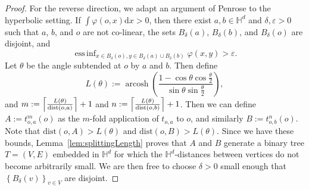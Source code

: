 \documentclass[10pt,a4paper,dvipsnames]{article}
\theoremstyle{definition}
\theoremstyle{remark}
\newcommand{\HypDim}{{\mathbb{H}^d}}
\newcommand{\dd}{\mathrm{d}} %
\DeclareMathOperator*{\essinf}{ess\,inf}
\DeclareMathOperator{\arcosh}{arcosh}
\DeclarePairedDelimiter\ceil{\lceil}{\rceil}
\newcommand{\dist}[1]{\mathrm{dist}\left(#1\right)}
\newcommand{\orig}{o}
\newcommand{\connf}{\varphi}
\numberwithin{equation}{section}
\begin{document}
\begin{proof}
    For the reverse direction, we adapt an argument of Penrose \cite{Pen91} to the hyperbolic setting. 
    If $\int\connf(\orig,x)\dd x>0$, then there exist $a,b\in\HypDim$ and $\delta,\varepsilon>0$ such that $a$, $b$, and $\orig$ are not co-linear, the sets $B_\delta(a)$, $B_\delta(b)$, and $B_\delta(\orig)$ are disjoint, and 
    \begin{equation}
        \essinf_{x\in B_\delta(\orig),y\in B_\delta(a)\cup B_\delta(b)}\connf(x,y)>\varepsilon.
    \end{equation}
    Let $\theta$ be the angle subtended at $\orig$ by $a$ and $b$. Then define
    \begin{equation}
        L\left(\theta\right) := \arcosh\left(\frac{1-\cos\theta\cos\frac{\theta}{2}}{\sin\theta\sin\frac{\theta}{2}}\right),
    \end{equation}
    and $m:=\ceil*{\frac{L(\theta)}{\dist{\orig,a}}}+1$ and $n:=\ceil*{\frac{L(\theta)}{\dist{\orig,b}}}+1$. Then we can define $A:= t_{\orig,a}^m(\orig)$ as the $m$-fold application of $t_{\orig,a}$ to $\orig$, and similarly $B:= t_{\orig,b}^n(\orig)$. Note that $\dist{\orig,A}>L(\theta)$ and $\dist{\orig,B}>L(\theta)$. Since we have these bounds, Lemma~\ref{lem:splittingLength} proves that $A$ and $B$ generate a binary tree $T=(V,E)$ embedded in $\HypDim$ for which the $\HypDim$-distances between vertices do not become arbitrarily small. We are then free to choose $\delta>0$ small enough that $\left\{B_\delta(v)\right\}_{v\in V}$ are disjoint.
    

\end{proof}
\end{document}
